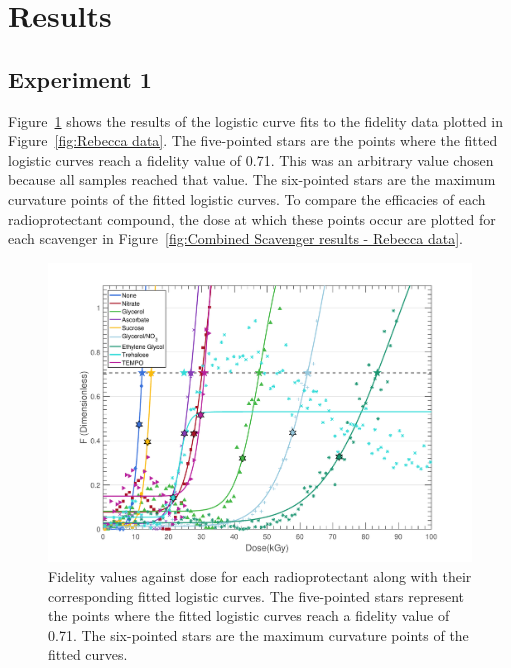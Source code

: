 \section{Results}
\label{sec:Results}

\subsection{Experiment 1}
\label{sub:Experiment 1 - Results}
Figure~\ref{fig:Main radioprotectant plot - Rebecca data} shows the results of the logistic curve fits to the fidelity data plotted in Figure~\ref{fig:Rebecca data}.
The five-pointed stars are the points where the fitted logistic curves reach a fidelity value of 0.71.
This was an arbitrary value chosen because all samples reached that value.
The six-pointed stars are the maximum curvature points of the fitted logistic curves.
To compare the efficacies of each radioprotectant compound, the dose at which these points occur are plotted for each scavenger in Figure~\ref{fig:Combined Scavenger results - Rebecca data}.

\begin{figure}
    \centering
    \includegraphics[width=1.0\textwidth]{figures/saxs/ScavengerPlot.pdf}
    \caption[Fidelity values as a function of dose for each radioprotectant]{Fidelity values against dose for each radioprotectant along with their corresponding fitted logistic curves.
    The five-pointed stars represent the points where the fitted logistic curves reach a fidelity value of 0.71.
    The six-pointed stars are the maximum curvature points of the fitted curves.}
    \label{fig:Main radioprotectant plot - Rebecca data}
\end{figure}

